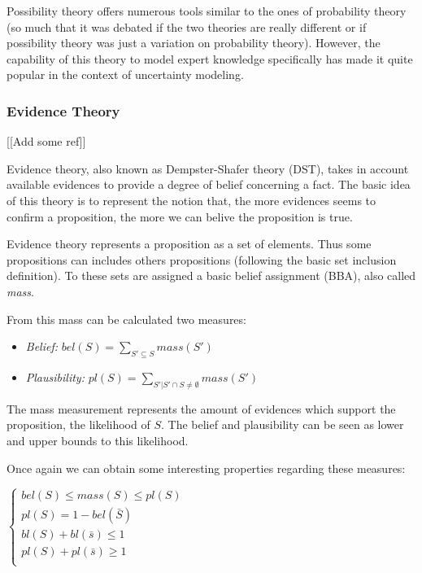 Possibility theory offers numerous tools similar to the ones of probability theory (so much that it was debated if the two theories are really different or if possibility theory was just a variation on probability theory). However, the capability of this theory to model expert knowledge specifically has made it quite popular in the context of uncertainty modeling.

\subsubsection{Evidence Theory}

[[Add some ref]]

Evidence theory, also known as Dempster-Shafer theory (DST), takes in account available evidences to provide a degree of belief concerning a fact.
The basic idea of this theory is to represent the notion that, the more evidences seems to confirm a proposition, the more we can belive the proposition is true.

Evidence theory represents a proposition as a set of elements. Thus some propositions can includes others propositions (following the basic set inclusion definition). To these sets are assigned a basic belief assignment (BBA), also called \emph{mass}.

From this mass can be calculated two measures:

\begin{itemize}
\item \emph{Belief:} $bel(S) = \sum_{S'\subseteq{S}} mass(S')$
\item \emph{Plausibility:} $pl(S) = \sum_{S'|S' \cap S \neq \emptyset} mass(S')$
\end{itemize}

The mass measurement represents the amount of evidences which support the proposition, the likelihood of $S$. The belief and plausibility can be seen as lower and upper bounds to this likelihood.

Once again we can obtain some interesting properties regarding these measures:

$\left\{
\begin{array}{l}
bel(S) \leq mass(S) \leq pl(S)\\
pl(S) = 1 - bel(\bar{S})\\
bl(S) + bl(\bar{s}) \leq 1\\
pl(S) + pl(\bar{s}) \geq 1\\
\end{array}
\right.$


